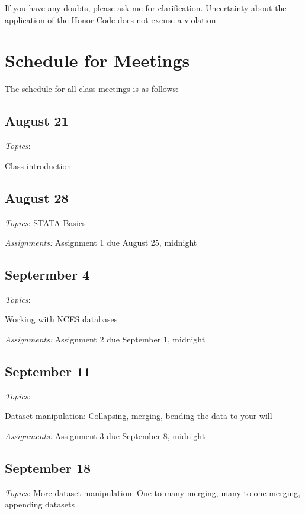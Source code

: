 \documentclass[12pt]{article}
\begin{document}
If you have any doubts, please ask me for clarification. Uncertainty
about the application of the Honor Code does not excuse a violation.

\section{Schedule for Meetings}

The schedule for all class meetings is as follows:

\begin{flushleft}

\subsection{August 21}

\textit{Topics}:

Class introduction

\subsection{August 28}



\textit{Topics}:
STATA Basics

\textit {Assignments:}
Assignment 1 due August 25, midnight

\subsection{Septermber 4}


\textit{Topics}:

Working with NCES databases

\textit {Assignments:}
Assignment 2 due September 1, midnight

\subsection{September 11}


\textit{Topics}:

Dataset manipulation: Collapsing, merging, bending the data to your will


\textit {Assignments:}
Assignment 3 due September 8, midnight
\subsection{September 18}


\textit{Topics}:
More dataset manipulation: One to many merging, many to one merging, appending datasets


\end{flushleft}
\end{document}
